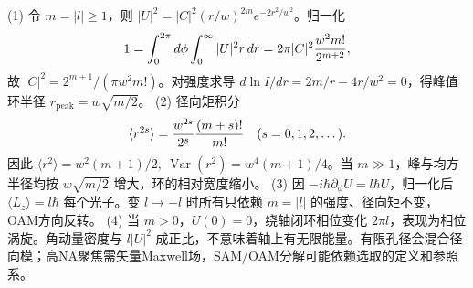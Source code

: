 (1) 令 \(m=|l|\ge1\)，则 \(|U|^2=|C|^2(r/w)^{2m}e^{-2r^2/w^2}\)。归一化
\[
1=\int_0^{2\pi}d\phi\int_0^\infty |U|^2r\,dr
=2\pi|C|^2{w^2m!\over2^{m+2}},
\]
故 \(|C|^2=2^{m+1}/(\pi w^2m!)\)。对强度求导 \(d\ln I/dr=2m/r-4r/w^2=0\)，得峰值环半径 \(r_\mathrm{peak}=w\sqrt{m/2}\)。
(2) 径向矩积分
\[
\langle r^{2s}\rangle={w^{2s}\over2^s}{(m+s)!\over m!}\quad(s=0,1,2,\dots).
\]
因此 \(\langle r^2\rangle=w^2(m+1)/2,\ \operatorname{Var}(r^2)=w^4(m+1)/4\)。当 \(m\gg1\)，峰与均方半径均按 \(w\sqrt{m/2}\) 增大，环的相对宽度缩小。
(3) 因 \(-i\hbar\partial_\phi U=l\hbar U\)，归一化后 \(\langle L_z\rangle=l\hbar\) 每个光子。变 \(l\to-l\) 时所有只依赖 \(m=|l|\) 的强度、径向矩不变，OAM方向反转。
(4) 当 \(m>0\)，\(U(0)=0\)，绕轴闭环相位变化 \(2\pi l\)，表现为相位涡旋。角动量密度与 \(l|U|^2\) 成正比，不意味着轴上有无限能量。有限孔径会混合径向模；高NA聚焦需矢量Maxwell场，SAM/OAM分解可能依赖选取的定义和参照系。
